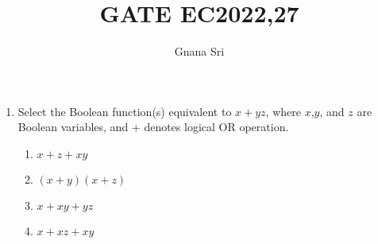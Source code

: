 \documentclass{article}
\begin{document}
\title{GATE EC2022,27}
\author{Gnana Sri}
\maketitle

\begin{enumerate}
	\item Select the Boolean function(s) equivalent to $x + yz$, where $x$,$y$, and $z$ are Boolean variables, and + denotes logical OR  operation.
		\begin{enumerate}[label=(\Alph*)]
			\item $x + z + {xy}$
			\item ${(x + y)}{(x + z)}$
			\item $x + {xy} + {yz}$
			\item $x + {xz} + {xy}$
		\end{enumerate}
\end{enumerate}
\end{document}
